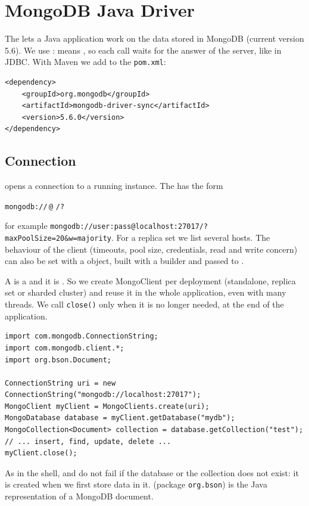 \section{MongoDB Java Driver}\label{sec:mongo-java}

The  lets a Java application work on the data stored in MongoDB (current version 5.6). We use :  means , so each call waits for the answer of the server, like in JDBC. With Maven we add to the \texttt{pom.xml}:
\begin{lstlisting}
<dependency>
    <groupId>org.mongodb</groupId>
    <artifactId>mongodb-driver-sync</artifactId>
    <version>5.6.0</version>
</dependency>
\end{lstlisting}

\subsection{Connection}
 opens a connection to a running instance. The  has the form
\begin{center}
\texttt{mongodb://}\,\texttt{@}\,\,\texttt{/?}
\end{center}
for example \texttt{mongodb://user:pass@localhost:27017/?maxPoolSize=20\&w=majority}. For a replica set we list several hosts. The behaviour of the client (timeouts, pool size, credentials, read and write concern) can also be set with a  object, built with a builder and passed to .

A  is a  and it is . So we create  MongoClient per deployment (standalone, replica set or sharded cluster) and reuse it in the whole application, even with many threads. We call \texttt{close()} only when it is no longer needed, at the end of the application.

\begin{lstlisting}
import com.mongodb.ConnectionString;
import com.mongodb.client.*;
import org.bson.Document;

ConnectionString uri = new ConnectionString("mongodb://localhost:27017");
MongoClient myClient = MongoClients.create(uri);
MongoDatabase database = myClient.getDatabase("mydb");
MongoCollection<Document> collection = database.getCollection("test");
// ... insert, find, update, delete ...
myClient.close();
\end{lstlisting}
As in the shell,  and  do not fail if the database or the collection does not exist: it is created when we first store data in it.  (package \texttt{org.bson}) is the Java representation of a MongoDB document.

